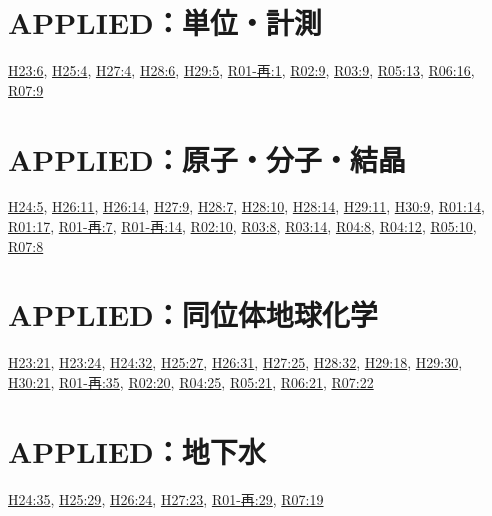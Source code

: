 \section{APPLIED：単位・計測}
\hyperref[q:h23-reg-applied-06]{H23:6}, \hyperref[q:h25-reg-applied-04]{H25:4}, \hyperref[q:h27-reg-applied-04]{H27:4}, \hyperref[q:h28-reg-applied-06]{H28:6}, \hyperref[q:h29-reg-applied-05]{H29:5}, \hyperref[q:r01-ret-applied-01]{R01-再:1}, \hyperref[q:r02-reg-applied-09]{R02:9}, \hyperref[q:r03-reg-applied-09]{R03:9}, \hyperref[q:r05-reg-applied-13]{R05:13}, \hyperref[q:r06-reg-applied-16]{R06:16}, \hyperref[q:r07-reg-applied-09]{R07:9}
\section{APPLIED：原子・分子・結晶}
\hyperref[q:h24-reg-applied-05]{H24:5}, \hyperref[q:h26-reg-applied-11]{H26:11}, \hyperref[q:h26-reg-applied-14]{H26:14}, \hyperref[q:h27-reg-applied-09]{H27:9}, \hyperref[q:h28-reg-applied-07]{H28:7}, \hyperref[q:h28-reg-applied-10]{H28:10}, \hyperref[q:h28-reg-applied-14]{H28:14}, \hyperref[q:h29-reg-applied-11]{H29:11}, \hyperref[q:h30-reg-applied-09]{H30:9}, \hyperref[q:r01-reg-applied-14]{R01:14}, \hyperref[q:r01-reg-applied-17]{R01:17}, \hyperref[q:r01-ret-applied-07]{R01-再:7}, \hyperref[q:r01-ret-applied-14]{R01-再:14}, \hyperref[q:r02-reg-applied-10]{R02:10}, \hyperref[q:r03-reg-applied-08]{R03:8}, \hyperref[q:r03-reg-applied-14]{R03:14}, \hyperref[q:r04-reg-applied-08]{R04:8}, \hyperref[q:r04-reg-applied-12]{R04:12}, \hyperref[q:r05-reg-applied-10]{R05:10}, \hyperref[q:r07-reg-applied-08]{R07:8}
\section{APPLIED：同位体地球化学}
\hyperref[q:h23-reg-applied-21]{H23:21}, \hyperref[q:h23-reg-applied-24]{H23:24}, \hyperref[q:h24-reg-applied-32]{H24:32}, \hyperref[q:h25-reg-applied-27]{H25:27}, \hyperref[q:h26-reg-applied-31]{H26:31}, \hyperref[q:h27-reg-applied-25]{H27:25}, \hyperref[q:h28-reg-applied-32]{H28:32}, \hyperref[q:h29-reg-applied-18]{H29:18}, \hyperref[q:h29-reg-applied-30]{H29:30}, \hyperref[q:h30-reg-applied-21]{H30:21}, \hyperref[q:r01-ret-applied-35]{R01-再:35}, \hyperref[q:r02-reg-applied-20]{R02:20}, \hyperref[q:r04-reg-applied-25]{R04:25}, \hyperref[q:r05-reg-applied-21]{R05:21}, \hyperref[q:r06-reg-applied-21]{R06:21}, \hyperref[q:r07-reg-applied-22]{R07:22}
\section{APPLIED：地下水}
\hyperref[q:h24-reg-applied-35]{H24:35}, \hyperref[q:h25-reg-applied-29]{H25:29}, \hyperref[q:h26-reg-applied-24]{H26:24}, \hyperref[q:h27-reg-applied-23]{H27:23}, \hyperref[q:r01-ret-applied-29]{R01-再:29}, \hyperref[q:r07-reg-applied-19]{R07:19}
